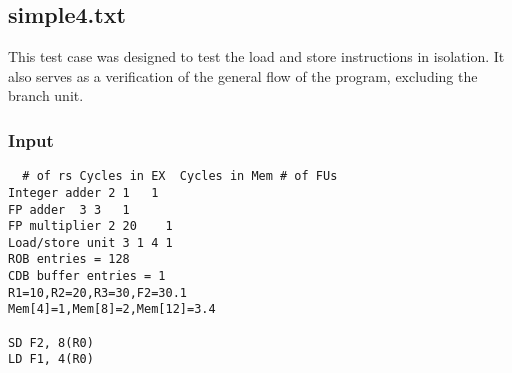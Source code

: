 \documentclass[12pt]{article}
\begin{document}
\subsection{simple4.txt}
This test case was designed to test the load and store instructions in isolation.  It also serves as a verification of the general flow of the program, excluding the branch unit.

\subsubsection*{Input}
\begin{verbatim}
  # of rs Cycles in EX  Cycles in Mem # of FUs
Integer adder 2 1   1
FP adder  3 3   1
FP multiplier 2 20    1
Load/store unit 3 1 4 1
ROB entries = 128
CDB buffer entries = 1
R1=10,R2=20,R3=30,F2=30.1
Mem[4]=1,Mem[8]=2,Mem[12]=3.4

SD F2, 8(R0)
LD F1, 4(R0)
\end{verbatim}
\end{document}
